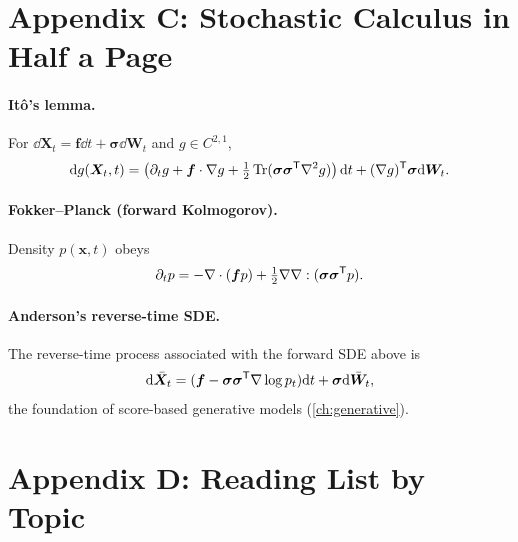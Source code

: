 \section*{Appendix C: Stochastic Calculus in Half a Page}

\paragraph{It\^o's lemma.}
For $\dd\bm{X}_t=\bm{f}\dd t+\bm{\sigma}\dd\bm{W}_t$ and $g\in C^{2,1}$,
\[
\mathrm{d} g(\bm{X}_t,t) = \left(\partial_t g + \bm{f}\cdot\nabla g + \tfrac{1}{2}\operatorname{Tr}(\bm{\sigma}\bm{\sigma}^{\mathsf{T}} \nabla^2 g)\right)\mathrm{d} t + (\nabla g)^{\mathsf{T}}\bm{\sigma}\mathrm{d}\bm{W}_t.
\]

\paragraph{Fokker--Planck (forward Kolmogorov).}
Density $p(\bm{x},t)$ obeys
\[
\partial_t p = -\nabla\cdot(\bm{f}p)+\tfrac{1}{2}\nabla\nabla:(\bm{\sigma}\bm{\sigma}^{\mathsf{T}} p).
\]

\paragraph{Anderson's reverse-time SDE.}
The reverse-time process associated with the forward SDE above is
\[
\mathrm{d} \bar{\bm{X}}_t = (\bm{f}-\bm{\sigma}\bm{\sigma}^{\mathsf{T}}\nabla\log p_t)\mathrm{d} t + \bm{\sigma}\mathrm{d}\bar{\bm{W}}_t,
\]
the foundation of score-based generative models (\cref{ch:generative}).

\section*{Appendix D: Reading List by Topic}

